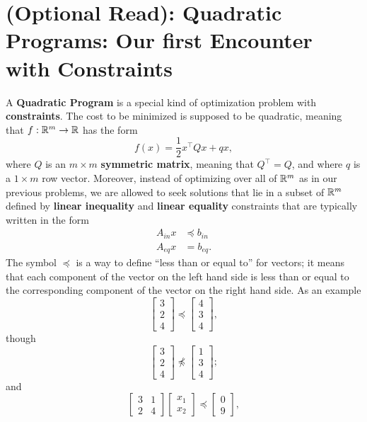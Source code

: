 \section{(Optional Read): Quadratic Programs: Our first Encounter with Constraints}
\label{sec:QPs}

A \textbf{Quadratic Program} is a special kind of optimization problem with \textbf{constraints}. The cost to be minimized is supposed to be quadratic, meaning that $f:\mathbb R^m \to \mathbb R $ has the form
\begin{equation}
    \label{eq:QPconst}
    f(x) = \frac{1}{2} x^\top Q x + q x, 
\end{equation}
where $Q$ is an $m\times m$ \textbf{symmetric matrix}, meaning that $Q^\top = Q$, and where $q$ is a $1 \times m$ row vector. Moreover, instead of optimizing over all of $\mathbb R^m$ as in our previous problems, we are allowed to seek solutions that lie in a subset of $\mathbb R^m$ defined by \textbf{linear inequality} and \textbf{linear equality} constraints that are typically written in the form
\begin{align}
\label{eq:QPconstraintsInequality}
   A_{in} x & \preceq b_{in} \\
   \label{eq:QPconstraintsEquality}
   A_{eq} x & = b_{eq}.
\end{align}
The symbol $\preceq$ is a way to define ``less than or equal to'' for vectors; it means that each component of the vector on the left hand side is less than or equal to the corresponding component of the vector on the right hand side. As an example 
$$\begin{bmatrix}3 \\ 2 \\ 4\end{bmatrix} \preceq \begin{bmatrix}4 \\ 3 \\ 4\end{bmatrix},  $$
   though 
$$\begin{bmatrix}3 \\ 2 \\ 4\end{bmatrix} \not \preceq \begin{bmatrix}1 \\ 3 \\ 4\end{bmatrix};  $$ 
and 
$$\begin{bmatrix}3 & 1 \\ 2 & 4\end{bmatrix}\begin{bmatrix}x_1 \\ x_2 \end{bmatrix} \preceq \begin{bmatrix}0 \\ 9\end{bmatrix},  $$
